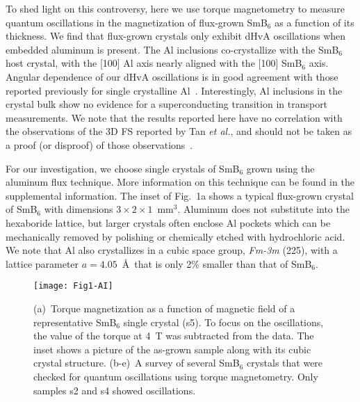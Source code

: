 \documentclass[twocolumn,preprintnumbers,amsmath,amssymb]{revtex4}
\begin{document}
To shed light on this controversy, here we use torque magnetometry to measure quantum oscillations in the magnetization of flux-grown SmB$_{6}$ as a function of its thickness.
We find that flux-grown crystals only exhibit dHvA oscillations when embedded aluminum is present.
The Al inclusions co-crystallize with the SmB$_6$ host crystal, with the [100] Al axis nearly aligned with the [100] SmB$_6$ axis.
Angular dependence of our dHvA oscillations is in good agreement with those reported previously for single crystalline Al~\cite{Larson1967}.
Interestingly, Al inclusions in the crystal bulk show no evidence for a superconducting transition in transport measurements.
We note that the results reported here have no correlation with the observations of the 3D FS reported by Tan \textit{et al.}, and should not be taken 
as a proof (or disproof) of those observations~\cite{Tan2015}.


For our investigation, we choose single crystals of SmB$_{6}$ grown using the aluminum flux technique.
More information on this technique can be found in the supplemental information.
The inset of Fig.~1a shows a typical flux-grown crystal of SmB$_6$ with dimensions $3\times 2\times 1$~mm$^{3}$.
Aluminum does not substitute into the hexaboride lattice, but larger crystals often enclose Al pockets which can be mechanically removed by polishing or chemically etched with hydrochloric acid.
We note that Al also crystallizes in a cubic space group, \textit{Fm-3m} (225), with a lattice parameter $a=4.05$~\AA$\,$ that is only 2\% smaller than that of SmB$_6$.

\begin{figure}[!h]
\begin{center}
\texttt{[image: Fig1-AI]}
\vspace{-0.7cm}
\end{center}
\caption{
(a)~Torque magnetization as a function of magnetic field of a representative SmB$_{6}$ single crystal (s5).
To focus on the oscillations, the value of the torque at 4~T was subtracted from the data.
The inset shows a picture of the as-grown sample along with its cubic crystal structure.
(b-e)~A survey of several SmB$_{6}$ crystals that were checked for quantum oscillations using torque magnetometry. Only samples s2 and s4 showed oscillations.
}\label{fig:oscillations}
\end{figure}
\end{document}
